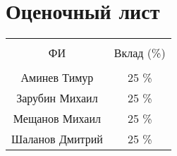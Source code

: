 \section{Оценочный лист}

\begin{tabular}{c c}
  \toprule \\
  ФИ & Вклад (\%) \\
  \midrule \\
  Аминев Тимур    & 25 \% \\
  Зарубин Михаил  & 25 \% \\
  Мещанов Михаил  & 25 \% \\
  Шаланов Дмитрий & 25 \% \\
  \bottomrule
\end{tabular}
